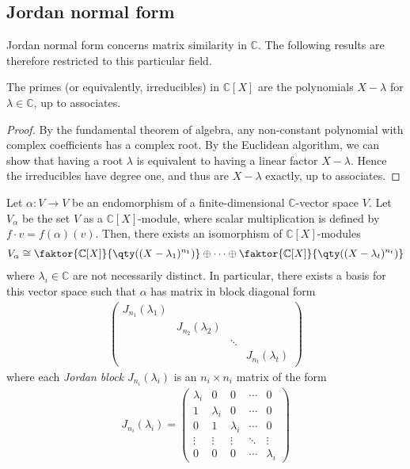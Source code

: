 \subsection{Jordan normal form}
Jordan normal form concerns matrix similarity in $\mathbb C$.
The following results are therefore restricted to this particular field.
\begin{lemma}
	The primes (or equivalently, irreducibles) in $\mathbb C[X]$ are the polynomials $X - \lambda$ for $\lambda \in \mathbb C$, up to associates.
\end{lemma}
\begin{proof}
	By the fundamental theorem of algebra, any non-constant polynomial with complex coefficients has a complex root.
	By the Euclidean algorithm, we can show that having a root $\lambda$ is equivalent to having a linear factor $X - \lambda$.
	Hence the irreducibles have degree one, and thus are $X - \lambda$ exactly, up to associates.
\end{proof}
\begin{theorem}
	Let $\alpha : V \to V$ be an endomorphism of a finite-dimensional $\mathbb C$-vector space $V$.
	Let $V_\alpha$ be the set $V$ as a $\mathbb C[X]$-module, where scalar multiplication is defined by $f\cdot v = f(\alpha)(v)$.
	Then, there exists an isomorphism of $\mathbb C[X]$-modules
	\begin{align*}
		V_\alpha \cong \faktor{\mathbb C[X]}{\qty((X-\lambda_1)^{n_1})} \oplus \dots \oplus \faktor{\mathbb C[X]}{\qty((X-\lambda_t)^{n_t})}
	\end{align*}
	where $\lambda_i \in \mathbb C$ are not necessarily distinct.
	In particular, there exists a basis for this vector space such that $\alpha$ has matrix in block diagonal form
	\begin{align*}
		\begin{pmatrix}
			J_{n_1}(\lambda_1)                                  \\
			 & J_{n_2}(\lambda_2)                               \\
			 &                    & \ddots                      \\
			 &                    &        & J_{n_t}(\lambda_t)
		\end{pmatrix}
	\end{align*}
	where each \textit{Jordan block} $J_{n_i}(\lambda_i)$ is an $n_i \times n_i$ matrix of the form
	\begin{align*}
		J_{n_i}(\lambda_i) = \begin{pmatrix}
			\lambda_i & 0         & 0         & \cdots & 0         \\
			1         & \lambda_i & 0         & \cdots & 0         \\
			0         & 1         & \lambda_i & \cdots & 0         \\
			\vdots    & \vdots    & \vdots    & \ddots & \vdots    \\
			0         & 0         & 0         & \cdots & \lambda_i
		\end{pmatrix}
	\end{align*}
\end{theorem}
